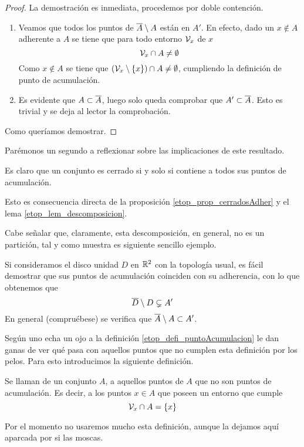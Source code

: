 \begin{proof}
	La demostración es inmediata, procedemos por doble contención.
	\begin{enumerate}
		\item[\bsubset] Veamos que todos los puntos de $\overline{A}\setminus A$ están en $A'$. En efecto, dado un $x\not\in A$ adherente a $A$ se tiene que para todo entorno $\mathcal{V}_x$ de $x$
		\begin{equation*}
		\mathcal{V}_x\cap A\not=\emptyset
		\end{equation*}
		Como $x\not\in A$ se tiene que $(\mathcal{V}_x\setminus\{x\})\cap A\not=\emptyset$, cumpliendo la definición de punto de acumulación.
		\item[\bsupset] Es evidente que $A\subset\overline{A}$, luego solo queda comprobar que $A'\subset \overline{A}$. Esto es trivial y se deja al lector la comprobación.
	\end{enumerate}
	Como queríamos demostrar.
\end{proof}
Parémonos un segundo a reflexionar sobre las implicaciones de este resultado.
\begin{obs}
	Es claro que un conjunto es cerrado si y solo si contiene a todos sus puntos de acumulación.
	
	Esto es consecuencia directa de la proposición \ref{etop_prop_cerradosAdher} y el lema \ref{etop_lem_descomposicion}.
\end{obs}
Cabe señalar que, claramente, esta descomposición, en general, no es un partición, tal y como muestra es siguiente sencillo ejemplo.
\begin{exa}[Disco]
	Si consideramos el disco unidad $D$ en $\mathbb{R}^2$ con la topología usual, es fácil demostrar que sus puntos de acumulación coinciden con su adherencia, con lo que obtenemos que
	\begin{equation}
	\overline{D}\setminus D \subsetneq A'
	\end{equation}
	En general (compruébese) se verifica que $\overline{A}\setminus A\subset A'$.
\end{exa}
Según uno echa un ojo a la definición \ref{etop_defi_puntoAcumulacion} le dan ganas de ver qué pasa con aquellos puntos que no cumplen esta definición por los pelos. Para esto introducimos la siguiente definición.
\begin{defi}
	Se llaman  de un conjunto $A$, a aquellos puntos de $A$ que no son puntos de acumulación. Es decir, a los puntos $x\in A$ que poseen un entorno que cumple
	\begin{equation*}
	\mathcal{V}_x\cap A = \{x\}
	\end{equation*}
\end{defi}
Por el momento no usaremos mucho esta definición, aunque la dejamos aquí aparcada por si las moscas.

